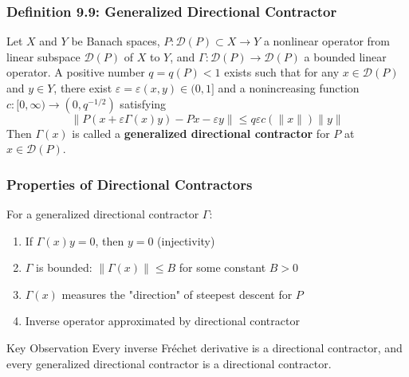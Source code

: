 \documentclass[aspectratio=169,10pt]{beamer}
\begin{document}
\begin{frame}
    \frametitle{Definition 9.9: Generalized Directional Contractor}

    \begin{definition}
        Let $X$ and $Y$ be Banach spaces, $P: \mathcal{D}(P) \subset X \to Y$ a nonlinear operator from linear subspace $\mathcal{D}(P)$ of $X$ to $Y$, and $\Gamma: \mathcal{D}(P) \to \mathcal{D}(P)$ a bounded linear operator. A positive number $q = q(P) < 1$ exists such that for any $x \in \mathcal{D}(P)$ and $y \in Y$, there exist $\varepsilon = \varepsilon(x,y) \in (0,1]$ and a nonincreasing function $c: [0,\infty) \to (0, q^{-1/2})$ satisfying
        \[
        \|P(x + \varepsilon\Gamma(x)y) - Px - \varepsilon y\| \leq q\varepsilon c(\|x\|)\|y\|
        \]
        Then $\Gamma(x)$ is called a \textbf{generalized directional contractor} for $P$ at $x \in \mathcal{D}(P)$.
    \end{definition}
\end{frame}

\begin{frame}
    \frametitle{Properties of Directional Contractors}

    \begin{theorem}
        For a generalized directional contractor $\Gamma$:
        \begin{enumerate}
            \item If $\Gamma(x)y = 0$, then $y = 0$ (injectivity)
            \item $\Gamma$ is bounded: $\|\Gamma(x)\| \leq B$ for some constant $B > 0$
            \item $\Gamma(x)$ measures the "direction" of steepest descent for $P$
            \item Inverse operator approximated by directional contractor
        \end{enumerate}
    \end{theorem}

    \bigskip

    \begin{block}{Key Observation}
        Every inverse Fréchet derivative is a directional contractor, and every generalized directional contractor is a directional contractor.
    \end{block}
\end{frame}
\end{document}
